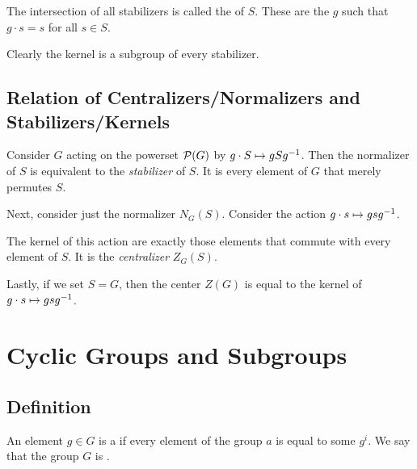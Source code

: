 \documentclass[11pt, oneside]{amsart}
\begin{document}
\begin{definition}
  The intersection of all stabilizers is called the  of
  $S$. These are the $g$ such that $g \cdot s = s$ for all $s \in S$.
\end{definition}

\begin{remark}
  Clearly the kernel is a subgroup of every stabilizer.
\end{remark}

\subsection{Relation of Centralizers/Normalizers and Stabilizers/Kernels}

\begin{remark}
  Consider $G$ acting on the powerset $\mathcal{P}\mathopen{}\left( {G} \right)\mathclose{}$ by $g \cdot S
  \mapsto gS{g}^{-1}$. Then the normalizer of $S$ is equivalent to the
  \emph{stabilizer} of $S$. It is every element of $G$ that merely
  permutes $S$.
\end{remark}

\begin{remark}
  Next, consider just the normalizer $N_G(S)$. Consider the action $g
  \cdot s \mapsto g s {g}^{-1}$.

  The kernel of this action are exactly those elements that commute with
  every element of $S$. It is the \emph{centralizer} $Z_G(S)$.
\end{remark}

\begin{remark}
  Lastly, if we set $S = G$, then the center $Z(G)$ is equal to the
  kernel of $g \cdot s \mapsto g s {g}^{-1}$.
\end{remark}

\section{Cyclic Groups and Subgroups}

\subsection{Definition}

\begin{definition}
  An element $g \in G$ is a  if every element of the
  group $a$ is equal to some $g^i$. We say that the group $G$ is
  .
\end{definition}
\end{document}
